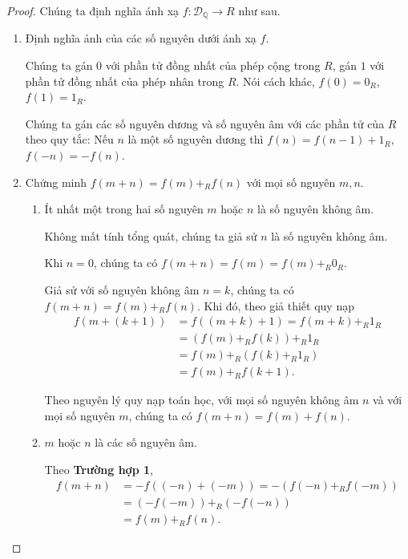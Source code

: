 \begin{proof}
    Chúng ta định nghĩa ánh xạ $f: \mathscr{D}_{\mathbb{Q}}\to R$ như sau.

    \begin{enumerate}[label={\textbf{Bước \arabic*.}},itemindent=1cm]
        \item Định nghĩa ảnh của các số nguyên dưới ánh xạ $f$.

              Chúng ta gán $0$ với phần tử đồng nhất của phép cộng trong $R$, gán $1$ với phần tử đồng nhất của phép nhân trong $R$. Nói cách khác, $f(0) = 0_{R}$, $f(1) = 1_{R}$.

              Chúng ta gán các số nguyên dương và số nguyên âm với các phần tử của $R$ theo quy tắc: Nếu $n$ là một số nguyên dương thì $f(n) = f(n-1) + 1_{R}$, $f(-n) = -f(n)$.
        \item Chứng minh $f(m + n) = f(m) +_{R} f(n)$ với mọi số nguyên $m, n$.
              \begin{enumerate}[label={\textbf{Trường hợp \arabic*.}},itemindent=1.5cm]
                  \item Ít nhất một trong hai số nguyên $m$ hoặc $n$ là số nguyên không âm.

                        Không mất tính tổng quát, chúng ta giả sử $n$ là số nguyên không âm.

                        Khi $n = 0$, chúng ta có $f(m + n) = f(m) = f(m) +_{R} 0_{R}$.

                        Giả sử với số nguyên không âm $n = k$, chúng ta có $f(m + n) = f(m) +_{R} f(n)$. Khi đó, theo giả thiết quy nạp
                        \begin{align*}
                            f(m + (k+1)) & = f((m + k) + 1) = f(m + k) +_{R} 1_{R} \\
                                         & = (f(m) +_{R} f(k)) +_{R} 1_{R}         \\
                                         & = f(m) +_{R} (f(k) +_{R} 1_{R})         \\
                                         & = f(m) +_{R} f(k+1).
                        \end{align*}

                        Theo nguyên lý quy nạp toán học, với mọi số nguyên không âm $n$ và với mọi số nguyên $m$, chúng ta có $f(m + n) = f(m) + f(n)$.
                  \item $m$ hoặc $n$ là các số nguyên âm.

                        Theo \textbf{Trường hợp 1},
                        \begin{align*}
                            f(m + n) & = -f((-n) + (-m)) = -(f(-n) +_{R} f(-m)) \\
                                     & = (-f(-m)) +_{R} (-f(-n))                \\
                                     & = f(m) +_{R} f(n).
                        \end{align*}
              \end{enumerate}


\end{enumerate}
\end{proof}
